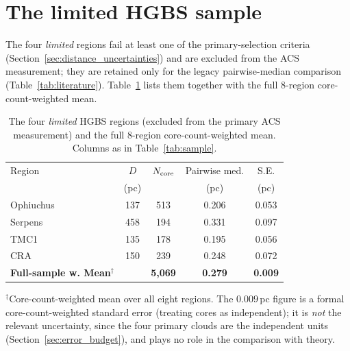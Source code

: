 \documentclass[usenatbib,twoside,twocolumn]{mnras}
\begin{document}

\appendix

\section{The limited HGBS sample}
\label{sec:limited_sample}
The four \emph{limited} regions fail at least one of the primary-selection criteria (Section~\ref{sec:distance_uncertainties}) and are excluded from the ACS measurement; they are retained only for the legacy pairwise-median comparison (Table~\ref{tab:literature}). Table~\ref{tab:sample_limited} lists them together with the full 8-region core-count-weighted mean.

\begin{table}
\caption{The four \emph{limited} HGBS regions (excluded from the primary ACS measurement) and the full 8-region core-count-weighted mean. Columns as in Table~\ref{tab:sample}.}
\label{tab:sample_limited}
\footnotesize
\setlength{\tabcolsep}{3pt}
\begin{tabular}{lcccc}
\toprule
Region & $D$ & $N_{\rm core}$ & Pairwise med. & S.E. \\
       & (pc) &  & (pc) & (pc) \\
\midrule
Ophiuchus& 137 & 513   & 0.206 & 0.053 \\
Serpens  & 458 & 194   & 0.331 & 0.097 \\
TMC1     & 135 & 178   & 0.195 & 0.056 \\
CRA      & 150 & 239   & 0.248 & 0.072 \\
\midrule
\textbf{Full-sample w. Mean}$^\dagger$ &  & \textbf{5,069} & \textbf{0.279} & \textbf{0.009} \\
\bottomrule
\end{tabular}
\par\vspace{2pt}
\footnotesize $^\dagger$Core-count-weighted mean over all eight regions. The $0.009$\,pc figure is a formal core-count-weighted standard error (treating cores as independent); it is \emph{not} the relevant uncertainty, since the four primary clouds are the independent units (Section~\ref{sec:error_budget}), and plays no role in the comparison with theory.
\end{table}
\end{document}
